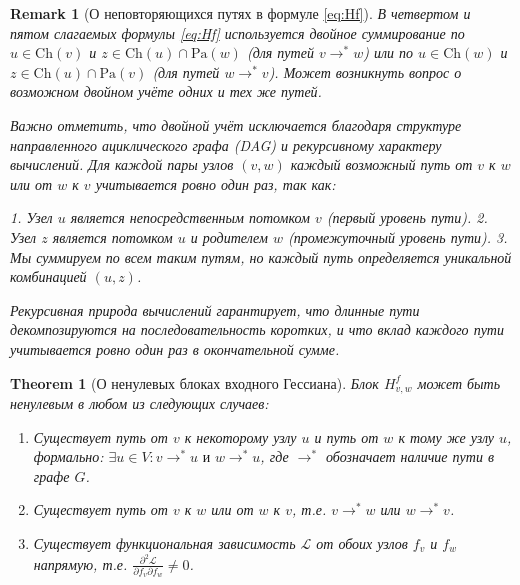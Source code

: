 \documentclass[11pt]{article}
\newtheorem{theorem}{Theorem}
\newtheorem{remark}{Remark}
\newcommand{\Pa}{\mathrm{Pa}} %
\newcommand{\Ch}{\mathrm{Ch}} %
\begin{document}
\begin{remark}[О неповторяющихся путях в формуле \eqref{eq:Hf}]
  В четвертом и пятом слагаемых формулы \eqref{eq:Hf} используется двойное суммирование по $u \in \Ch(v)$ и
  $z \in \Ch(u) \cap \Pa(w)$ (для путей $v \rightarrow^* w$) или по $u \in \Ch(w)$ и $z \in \Ch(u) \cap
  \Pa(v)$ (для путей $w \rightarrow^* v$). Может возникнуть вопрос о возможном двойном учёте одних и тех же путей.

  Важно отметить, что двойной учёт исключается благодаря структуре направленного ациклического графа (DAG) и
  рекурсивному характеру вычислений. Для каждой пары узлов $(v,w)$ каждый возможный путь от $v$ к $w$ или от
  $w$ к $v$ учитывается ровно один раз, так как:

  1. Узел $u$ является непосредственным потомком $v$ (первый уровень пути).
  2. Узел $z$ является потомком $u$ и родителем $w$ (промежуточный уровень пути).
  3. Мы суммируем по всем таким путям, но каждый путь определяется уникальной комбинацией $(u,z)$.

  Рекурсивная природа вычислений гарантирует, что длинные пути декомпозируются на последовательность
  коротких, и что вклад каждого пути учитывается ровно один раз в окончательной сумме.
\end{remark}

\begin{theorem}[О ненулевых блоках входного Гессиана]
  Блок $H^f_{v,w}$ может быть ненулевым в любом из следующих случаев:
  \begin{enumerate}
    \item Существует путь от $v$ к некоторому узлу $u$ и путь от $w$ к тому же узлу $u$, формально: $\exists u \in V: v
      \rightarrow^* u \text{ и } w \rightarrow^* u$, где $\rightarrow^*$ обозначает наличие пути в графе $G$.
    \item Существует путь от $v$ к $w$ или от $w$ к $v$, т.е. $v \rightarrow^* w$ или $w \rightarrow^* v$.
    \item Существует функциональная зависимость $\mathcal{L}$ от обоих узлов $f_v$ и $f_w$ напрямую, т.е.
      $\frac{\partial^2 \mathcal{L}}{\partial f_v \partial f_w} \neq 0$.
  \end{enumerate}
\end{theorem}
\end{document}
